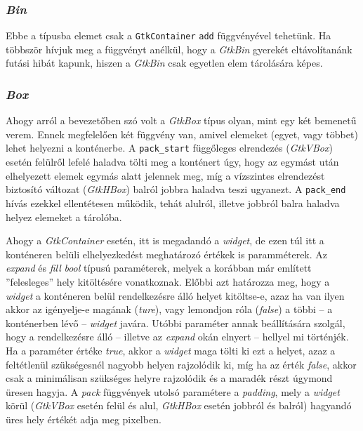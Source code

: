 \documentclass[a4paper,10pt]{article}
\begin{document}
\subsubsection{\textit{Bin}}

Ebbe a típusba elemet csak a \texttt{GtkContainer} \texttt{add} függvényével tehetünk. Ha többször hívjuk meg a függvényt anélkül, hogy a \textit{GtkBin} gyerekét eltávolítanánk futási hibát kapunk, hiszen a \textit{GtkBin} csak egyetlen elem tárolására képes.

\subsubsection{\textit{Box}}

Ahogy arról a bevezetőben szó volt a \textit{GtkBox} típus olyan, mint egy két bemenetű verem. Ennek megfelelően két függvény van, amivel elemeket (egyet, vagy többet) lehet helyezni a konténerbe. A \texttt{pack\_start} függőleges elrendezés (\textit{GtkVBox}) esetén felülről lefelé haladva tölti meg a konténert úgy, hogy az egymást után elhelyezett elemek egymás alatt jelennek meg, míg a vízszintes elrendezést biztosító változat (\textit{GtkHBox}) balról jobbra haladva teszi ugyanezt. A \texttt{pack\_end} hívás ezekkel ellentétesen működik, tehát alulról, illetve jobbról balra haladva helyez elemeket a tárolóba.

Ahogy a \textit{GtkContainer} esetén, itt is megadandó a \textit{widget}, de ezen túl itt a konténeren belüli elhelyezkedést meghatározó értékek is paramméterek. Az \textit{expand} és \textit{fill} \textit{bool} típusú paraméterek, melyek a korábban már említett ''felesleges'' hely kitöltésére vonatkoznak. Előbbi azt határozza meg, hogy a \textit{widget} a konténeren belül rendelkezésre álló helyet kitöltse-e, azaz ha van ilyen akkor az igényelje-e magának (\textit{ture}), vagy lemondjon róla (\textit{false}) a többi -- a konténerben lévő -- \textit{widget} javára. Utóbbi paraméter annak beállítására szolgál, hogy a rendelkezésre álló -- illetve az \textit{expand} okán elnyert -- hellyel mi történjék. Ha a paraméter értéke \textit{true}, akkor a \textit{widget} maga tölti ki ezt a helyet, azaz a feltétlenül szükségesnél nagyobb helyen rajzolódik ki, míg ha az érték \textit{false}, akkor csak a minimálisan szükséges helyre rajzolódik és a maradék részt úgymond üresen hagyja. A \textit{pack} függvények utolsó paramétere a \textit{padding}, mely a \textit{widget} körül (\textit{GtkVBox} esetén felül és alul, \textit{GtkHBox} esetén jobbról és balról) hagyandó üres hely értékét adja meg pixelben.
\end{document}
